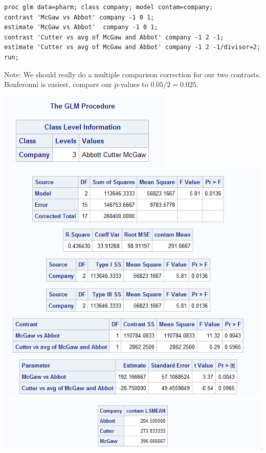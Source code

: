 \begin{small}
\begin{verbatim}
proc glm data=pharm; class company; model contam=company;
contrast 'McGaw vs Abbot' company -1 0 1;
estimate 'McGaw vs Abbot'  company -1 0 1;
contrast 'Cutter vs avg of McGaw and Abbot' company -1 2 -1;
estimate 'Cutter vs avg of McGaw and Abbot' company -1 2 -1/divisor=2; run;
\end{verbatim}
\end{small}
 Note: We should really do a multiple comparison correction for our two contrasts.  Bonferonni is easiest, compare our p-values to $0.05/2=0.025$.
\begin{center}
\includegraphics[scale=0.8]{PharmGLM1}\\
\includegraphics[scale=0.8]{PharmGLM2}\\
\includegraphics[scale=0.8]{PharmGLM3}
\end{center}

